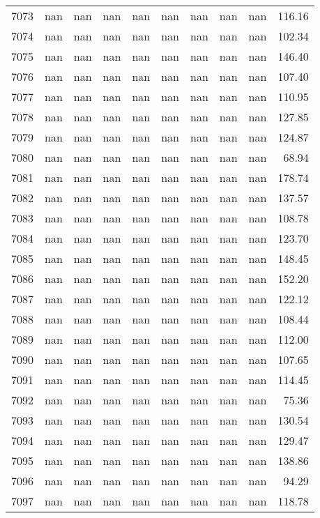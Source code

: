\begin{tabular}{lrrrrrrrrr}
7073 & nan & nan & nan & nan & nan & nan & nan & nan & 116.16 \\
7074 & nan & nan & nan & nan & nan & nan & nan & nan & 102.34 \\
7075 & nan & nan & nan & nan & nan & nan & nan & nan & 146.40 \\
7076 & nan & nan & nan & nan & nan & nan & nan & nan & 107.40 \\
7077 & nan & nan & nan & nan & nan & nan & nan & nan & 110.95 \\
7078 & nan & nan & nan & nan & nan & nan & nan & nan & 127.85 \\
7079 & nan & nan & nan & nan & nan & nan & nan & nan & 124.87 \\
7080 & nan & nan & nan & nan & nan & nan & nan & nan & 68.94 \\
7081 & nan & nan & nan & nan & nan & nan & nan & nan & 178.74 \\
7082 & nan & nan & nan & nan & nan & nan & nan & nan & 137.57 \\
7083 & nan & nan & nan & nan & nan & nan & nan & nan & 108.78 \\
7084 & nan & nan & nan & nan & nan & nan & nan & nan & 123.70 \\
7085 & nan & nan & nan & nan & nan & nan & nan & nan & 148.45 \\
7086 & nan & nan & nan & nan & nan & nan & nan & nan & 152.20 \\
7087 & nan & nan & nan & nan & nan & nan & nan & nan & 122.12 \\
7088 & nan & nan & nan & nan & nan & nan & nan & nan & 108.44 \\
7089 & nan & nan & nan & nan & nan & nan & nan & nan & 112.00 \\
7090 & nan & nan & nan & nan & nan & nan & nan & nan & 107.65 \\
7091 & nan & nan & nan & nan & nan & nan & nan & nan & 114.45 \\
7092 & nan & nan & nan & nan & nan & nan & nan & nan & 75.36 \\
7093 & nan & nan & nan & nan & nan & nan & nan & nan & 130.54 \\
7094 & nan & nan & nan & nan & nan & nan & nan & nan & 129.47 \\
7095 & nan & nan & nan & nan & nan & nan & nan & nan & 138.86 \\
7096 & nan & nan & nan & nan & nan & nan & nan & nan & 94.29 \\
7097 & nan & nan & nan & nan & nan & nan & nan & nan & 118.78 \\

\end{tabular}
